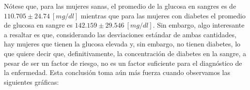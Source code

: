 \documentclass{article}
\begin{document}
Nótese que, para las mujeres sanas, el promedio de la glucosa en sangres es de $110.705\pm24.74\ [mg/dl]$ mientras que  para las mujeres con diabetes el promedio de glucosa en sangre es $142.159\pm29.546\ [mg/dl]$. Sin embargo, algo interesante a resaltar es que, considerando las desviaciones estándar de ambas cantidades, hay mujeres que tienen la glucosa elevada y, sin embargo, no tienen diabetes, lo que quiere decir que, definitivamente, la concentración de diabetes en la sangre, a pesar de ser un factor de riesgo, no es un factor suficiente para el diagnóstico de la enfermedad. Esta conclusión toma aún más fuerza cuando observamos las siguientes gráficas:

\onecolumn{
  
  
}
\end{document}

